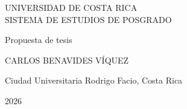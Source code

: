 \documentclass[../tesis.tex]{subfiles}
\begin{document}
\begin{titlingpage}
    \begin{center}
        \begin{large}
            \begin{Large}
                \MakeUppercase{Universidad de Costa Rica}\\
                \MakeUppercase{Sistema de Estudios de Posgrado}\\
            \end{Large}

            \vspace*{4cm}

            \begin{Large}
                \MakeUppercase{\thesistitle}
            \end{Large}

            \vspace*{3cm}

            \begin{minipage}{13cm}
                \centering
                Propuesta de tesis
            \end{minipage}

            \vspace*{2cm}

            \MakeUppercase{Carlos Benavides Víquez}

            \vfill
            Ciudad Universitaria Rodrigo Facio, Costa Rica

            \vspace*{1cm}
            2026
        \end{large}
    \end{center}
\end{titlingpage}
\end{document}
